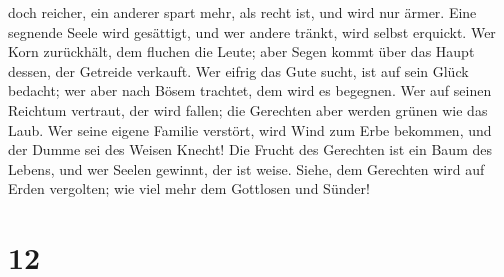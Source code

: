 doch reicher, ein anderer spart mehr, als recht ist, und wird nur ärmer.
 Eine segnende Seele wird gesättigt, und wer andere
tränkt, wird selbst erquickt.  Wer Korn zurückhält, dem
fluchen die Leute; aber Segen kommt über das Haupt dessen, der Getreide
verkauft.  Wer eifrig das Gute sucht, ist auf sein Glück
bedacht; wer aber nach Bösem trachtet, dem wird es begegnen.
 Wer auf seinen Reichtum vertraut, der wird fallen; die
Gerechten aber werden grünen wie das Laub.  Wer seine
eigene Familie verstört, wird Wind zum Erbe bekommen, und der Dumme sei
des Weisen Knecht!  Die Frucht des Gerechten ist ein Baum
des Lebens, und wer Seelen gewinnt, der ist weise. 
Siehe, dem Gerechten wird auf Erden vergolten; wie viel mehr dem
Gottlosen und Sünder!

\hypertarget{section-11}{%
\section{12}\label{section-11}}

